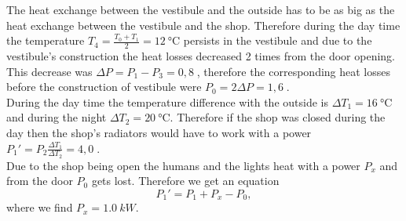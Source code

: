 \solueng
The heat exchange between the vestibule and the outside has to be as big as the heat exchange between the vestibule and the shop. Therefore during the day time the temperature $T_4=\frac{T_0+T_1}{2}=\SI{12}{\degreeCelsius}$ persists in the vestibule and due to the vestibule’s construction the heat losses decreased 2 times from the door opening. This decrease was $\Delta P=P_1-P_3=0,8\;$, therefore the corresponding heat losses before the construction of vestibule were $P_0=2\Delta P=1,6\;$. \\
During the day time the temperature difference with the outside is $\Delta T_1=\SI{16}{\degreeCelsius}$ and during the night $\Delta T_2=\SI{20}{\degreeCelsius}$. Therefore if the shop was closed during the day then the shop’s radiators would have to work with a power $P_1'=P_2\frac{\Delta T_1}{\Delta T_2}=4,0\;$.\\
Due to the shop being open the humans and the lights heat with a power $P_x$ and from the door $P_0$ gets lost. Therefore we get an equation
\[
P_1'=P_1+P_x-P_0,
\]
where we find $P_x=\SI{1,0}{kW}$.
\probend